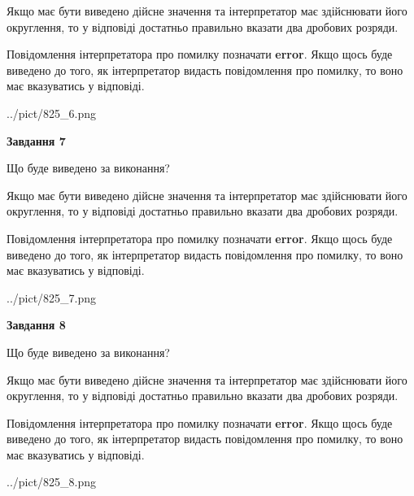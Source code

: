 \documentclass[12pt, ukrainian]{article}
\begin{document}
{\begin {Large}
Якщо має бути виведено дійсне значення та інтерпретатор має здійснювати його округлення, 
то у відповіді достатньо правильно вказати два дробових розряди.

Повідомлення інтерпретатора про помилку позначати \textbf{error}.
Якщо щось буде виведено до того, як інтерпретатор видасть повідомлення про помилку, 
то воно має вказуватись у відповіді. \par

\begin{center}
	{../pict/825_6.png}
\end{center}
\newpage

{\begin {center}\textbf{Завдання 7}\end {center}}\par
Що буде виведено за виконання? \par

Якщо має бути виведено дійсне значення та інтерпретатор має здійснювати його округлення, 
то у відповіді достатньо правильно вказати два дробових розряди.

Повідомлення інтерпретатора про помилку позначати \textbf{error}.
Якщо щось буде виведено до того, як інтерпретатор видасть повідомлення про помилку, 
то воно має вказуватись у відповіді. \par

\begin{center}
	{../pict/825_7.png}
\end{center}
\newpage

{\begin {center}\textbf{Завдання 8}\end {center}}\par
Що буде виведено за виконання? \par

Якщо має бути виведено дійсне значення та інтерпретатор має здійснювати його округлення, 
то у відповіді достатньо правильно вказати два дробових розряди.

Повідомлення інтерпретатора про помилку позначати \textbf{error}.
Якщо щось буде виведено до того, як інтерпретатор видасть повідомлення про помилку, 
то воно має вказуватись у відповіді. \par

\begin{center}
	{../pict/825_8.png}
\end{center}
\newpage


\end{Large}}
\end{document}
